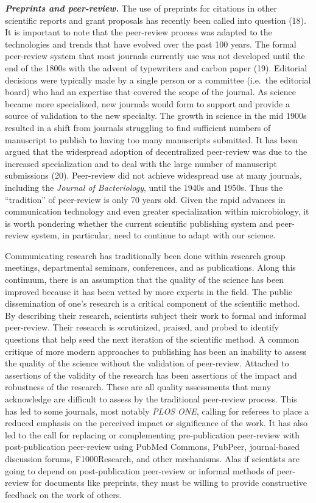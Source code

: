 \documentclass[11,]{article}
\begin{document}
\textbf{\emph{Preprints and peer-review.}} The use of preprints for
citations in other scientific reports and grant proposals has recently
been called into question (18). It is important to note that the
peer-review process was adapted to the technologies and trends that have
evolved over the past 100 years. The formal peer-review system that most
journals currently use was not developed until the end of the 1800s with
the advent of typewriters and carbon paper (19). Editorial decisions
were typically made by a single person or a committee (i.e.~the
editorial board) who had an expertise that covered the scope of the
journal. As science became more specialized, new journals would form to
support and provide a source of validation to the new specialty. The
growth in science in the mid 1900s resulted in a shift from journals
struggling to find sufficient numbers of manuscript to publish to having
too many manuscripts submitted. It has been argued that the widespread
adoption of decentralized peer-review was due to the increased
specialization and to deal with the large number of manuscript
submissions (20). Peer-review did not achieve widespread use at many
journals, including the \emph{Journal of Bacteriology}, until the 1940s
and 1950s. Thus the ``tradition'' of peer-review is only 70 years old.
Given the rapid advances in communication technology and even greater
specialization within microbiology, it is worth pondering whether the
current scientific publishing system and peer-review system, in
particular, need to continue to adapt with our science.

Communicating research has traditionally been done within research group
meetings, departmental seminars, conferences, and as publications. Along
this continuum, there is an assumption that the quality of the science
has been improved because it has been vetted by more experts in the
field. The public dissemination of one's research is a critical
component of the scientific method. By describing their research,
scientists subject their work to formal and informal peer-review. Their
research is scrutinized, praised, and probed to identify questions that
help seed the next iteration of the scientific method. A common critique
of more modern approaches to publishing has been an inability to assess
the quality of the science without the validation of peer-review.
Attached to assertions of the validity of the research has been
assertions of the impact and robustness of the research. These are all
quality assessments that many acknowledge are difficult to assess by the
traditional peer-review process. This has led to some journals, most
notably \emph{PLOS ONE}, calling for referees to place a reduced
emphasis on the perceived impact or significance of the work. It has
also led to the call for replacing or complementing pre-publication
peer-review with post-publication peer-review using PubMed Commons,
PubPeer, journal-based discussion forums, F1000Research, and other
mechanisms. Alas if scientists are going to depend on post-publication
peer-review or informal methods of peer-review for documents like
preprints, they must be willing to provide constructive feedback on the
work of others.
\end{document}
